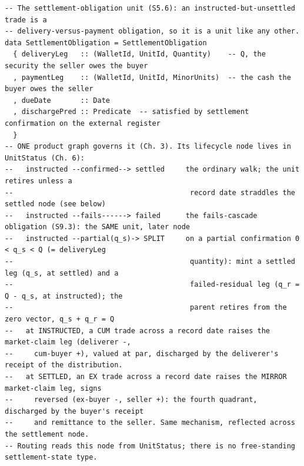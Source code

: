 \documentclass[11pt,a4paper]{article}
\begin{document}
\begin{lstlisting}
-- The settlement-obligation unit (S5.6): an instructed-but-unsettled trade is a
-- delivery-versus-payment obligation, so it is a unit like any other.
data SettlementObligation = SettlementObligation
  { deliveryLeg   :: (WalletId, UnitId, Quantity)    -- Q, the security the seller owes the buyer
  , paymentLeg    :: (WalletId, UnitId, MinorUnits)  -- the cash the buyer owes the seller
  , dueDate       :: Date
  , dischargePred :: Predicate  -- satisfied by settlement confirmation on the external register
  }
-- ONE product graph governs it (Ch. 3). Its lifecycle node lives in UnitStatus (Ch. 6):
--   instructed --confirmed--> settled     the ordinary walk; the unit retires unless a
--                                          record date straddles the settled node (see below)
--   instructed --fails------> failed      the fails-cascade obligation (S9.3): the SAME unit, later node
--   instructed --partial(q_s)-> SPLIT     on a partial confirmation 0 < q_s < Q (= deliveryLeg
--                                          quantity): mint a settled leg (q_s, at settled) and a
--                                          failed-residual leg (q_r = Q - q_s, at instructed); the
--                                          parent retires from the zero vector, q_s + q_r = Q
--   at INSTRUCTED, a CUM trade across a record date raises the market-claim leg (deliverer -,
--     cum-buyer +), valued at par, discharged by the deliverer's receipt of the distribution.
--   at SETTLED, an EX trade across a record date raises the MIRROR market-claim leg, signs
--     reversed (ex-buyer -, seller +): the fourth quadrant, discharged by the buyer's receipt
--     and remittance to the seller. Same mechanism, reflected across the settlement node.
-- Routing reads this node from UnitStatus; there is no free-standing settlement-state type.
\end{lstlisting}
\end{document}

